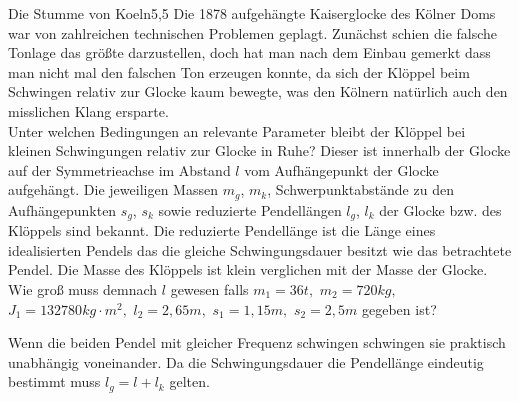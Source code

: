 \begin{problem}{Die Stumme von Koeln}{5,5}
Die 1878 aufgehängte Kaiserglocke des Kölner Doms war von zahlreichen technischen Problemen geplagt. Zunächst schien die falsche Tonlage das größte darzustellen, doch hat man nach dem Einbau gemerkt dass man nicht mal den falschen Ton erzeugen konnte, da sich der Klöppel beim Schwingen relativ zur Glocke kaum bewegte, was den Kölnern natürlich auch den misslichen Klang ersparte.\\
Unter welchen Bedingungen an relevante Parameter bleibt der Klöppel bei kleinen Schwingungen relativ zur Glocke in Ruhe? Dieser ist innerhalb der Glocke auf der Symmetrieachse im Abstand $l$ vom Aufhängepunkt der Glocke aufgehängt. Die jeweiligen Massen $m_g$, $m_k$, Schwerpunktabstände zu den Aufhängepunkten $s_g$, $s_k$ sowie reduzierte Pendellängen $l_g$, $l_k$ der Glocke bzw. des Klöppels sind bekannt. \hinweis Die reduzierte Pendellänge ist die Länge eines idealisierten Pendels das die gleiche Schwingungsdauer besitzt wie das betrachtete Pendel. Die Masse des Klöppels ist klein verglichen  mit der Masse der Glocke.\\
Wie groß muss demnach $l$ gewesen falls $m_1=36\unit{t},$ $m_2=720\unit{kg},$ $J_1=132780\unit{kg \cdot m^2},$ $l_2=2,65\unit{m},$ $s_1=1,15\unit{m},$ $s_2=2,5\unit{m}$ gegeben ist?
\begin{solution}
Wenn die beiden Pendel mit gleicher Frequenz schwingen schwingen sie praktisch unabhängig voneinander. Da die Schwingungsdauer die Pendellänge eindeutig bestimmt muss $l_g = l + l_k$ gelten.
\end{solution}
\end{problem}

